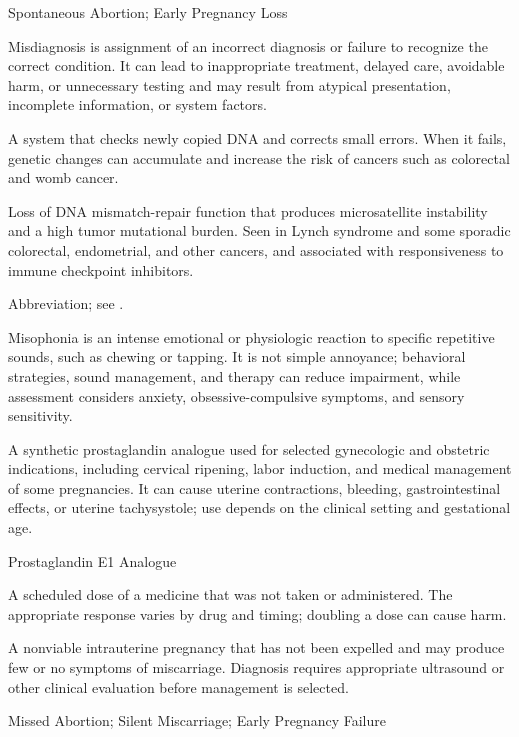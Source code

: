 \synonyms
Spontaneous Abortion; Early Pregnancy Loss

 Misdiagnosis is assignment of an incorrect diagnosis or failure to recognize the correct condition. It can lead to inappropriate treatment, delayed care, avoidable harm, or unnecessary testing and may result from atypical presentation, incomplete information, or system factors.

 A system that checks newly copied DNA and corrects small errors. When it fails, genetic changes can accumulate and increase the risk of cancers such as colorectal and womb cancer.

 Loss of DNA mismatch-repair function that produces microsatellite instability and a high
tumor mutational burden. Seen in Lynch syndrome and some sporadic colorectal,
endometrial, and other cancers, and associated with responsiveness to immune checkpoint
inhibitors.

 Abbreviation; see .

 Misophonia is an intense emotional or physiologic reaction to specific repetitive sounds, such as chewing or tapping. It is not simple annoyance; behavioral strategies, sound management, and therapy can reduce impairment, while assessment considers anxiety, obsessive-compulsive symptoms, and sensory sensitivity.

 A synthetic prostaglandin analogue used for selected gynecologic and obstetric indications, including cervical ripening,
labor induction, and medical management of some pregnancies. It can cause uterine
contractions, bleeding, gastrointestinal effects, or uterine tachysystole; use depends on
the clinical setting and gestational age.

\synonyms
Prostaglandin E1 Analogue

 A scheduled dose of a medicine that was not taken or administered. The appropriate response varies by drug and timing; doubling a dose can cause harm.

 A nonviable intrauterine pregnancy that has not been expelled and may produce few or no symptoms of miscarriage.
Diagnosis requires appropriate ultrasound or other clinical evaluation before management is selected.

\synonyms
Missed Abortion; Silent Miscarriage; Early Pregnancy Failure

